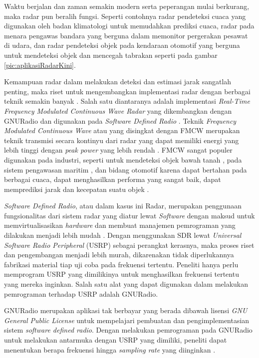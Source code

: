 Waktu berjalan dan zaman semakin modern serta peperangan mulai berkurang, maka radar pun beralih fungsi. Seperti contohnya radar pendeteksi cuaca yang digunakan oleh badan klimatologi untuk memudahkan prediksi cuaca, radar pada menara pengawas bandara yang berguna dalam memonitor pergerakan pesawat di udara, dan radar pendeteksi objek pada kendaraan otomotif yang berguna untuk mendeteksi objek dan mencegah tabrakan seperti pada gambar \ref{pic:aplikasiRadarKini}.

Kemampuan radar dalam melakukan deteksi dan estimasi jarak sangatlah penting, maka riset untuk mengembangkan implementasi radar dengan berbagai teknik semakin banyak \cite{Jia2020,Xia2021,MoraHuaman2020,Sundaresan2015}. Salah satu diantaranya adalah implementasi \textit{Real-Time Frequency Modulated Continuous Wave Radar} yang dikembangkan dengan GNURadio dan digunakan pada \textit{Software Defined Radio} \cite{Sundaresan2015}. Teknik \textit{Frequency Modulated Continuous Wave} atau yang disingkat dengan FMCW merupakan teknik transmisi secara kontinyu dari radar yang dapat memiliki energi yang lebih tinggi dengan \textit{peak power} yang lebih rendah \cite{Stasiak2017}. FMCW sangat populer digunakan pada industri, seperti untuk mendeteksi objek bawah tanah \cite{Macasero2018}, pada sistem pengawasan maritim \cite{Lestari2017}, dan bidang otomotif  karena dapat bertahan pada berbagai cuaca, dapat menghasilkan performa yang sangat baik, dapat memprediksi jarak dan kecepatan suatu objek \cite{Deng2017}. 

\textit{Software Defined Radio}, atau dalam kasus ini Radar, merupakan penggunaan fungsionalitas dari sistem radar yang diatur lewat \textit{Software} dengan maksud untuk memvirtualisasikan \textit{hardware} dan membuat manajemen pemrograman yang dilakukan menjadi lebih mudah \cite{Zeng2019}. Dengan menggunakan SDR lewat \textit{Universal Software Radio Peripheral} (USRP) sebagai perangkat kerasnya, maka proses riset dan pengembangan menjadi lebih murah, dikarenakan tidak diperlukannya fabrikasi material tiap uji coba pada frekuensi tertentu. Peneliti hanya perlu memprogram USRP yang dimilikinya untuk menghasilkan frekuensi tertentu yang mereka inginkan. Salah satu alat yang dapat digunakan dalam melakukan pemrograman terhadap USRP adalah GNURadio.


GNURadio merupakan aplikasi tak berbayar yang berada dibawah lisensi \textit{GNU General Public License} untuk mempelajari pembuatan dan pengimplementasian sistem \textit{software defined radio}. Dengan melakukan pemrograman pada GNURadio untuk melakukan antarmuka dengan USRP yang dimiliki, peneliti dapat menentukan berapa frekuensi hingga \textit{sampling rate} yang diinginkan \cite{Prabaswara2011}.

